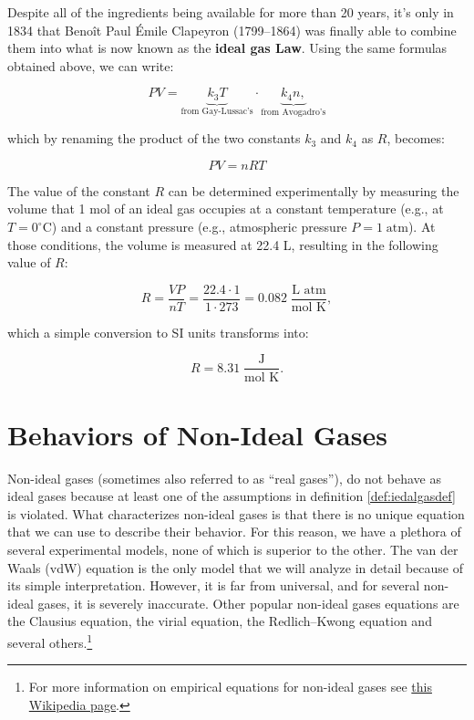 \documentclass[
  9pt,
]{extbook}
\theoremstyle{definition}
\theoremstyle{definition}
\theoremstyle{definition}
\theoremstyle{definition}
\theoremstyle{remark}
\begin{document}
Despite all of the ingredients being available for more than 20 years, it's only in 1834 that Benoît Paul Émile Clapeyron (1799--1864) was finally able to combine them into what is now known as the \textbf{ideal gas Law}. Using the same formulas obtained above, we can write:

\begin{equation}
PV=\underbrace{k_3 T}_{\text{from Gay-Lussac's}} \cdot \underbrace{k_4 n,}_{\text{from Avogadro's}}
\label{eq:ideallaw1}
\end{equation}

which by renaming the product of the two constants \(k_3\) and \(k_4\) as \(R\), becomes:

\begin{equation}
PV=nRT
\label{eq:ideallaw2}
\end{equation}

The value of the constant \(R\) can be determined experimentally by measuring the volume that 1 mol of an ideal gas occupies at a constant temperature (e.g., at \(T=0^\circ\mathrm{C}\)) and a constant pressure (e.g., atmospheric pressure \(P=1\;\mathrm{atm}\)). At those conditions, the volume is measured at 22.4 L, resulting in the following value of \(R\):

\begin{equation}
R=\frac{VP}{nT}=\frac{22.4 \cdot 1}{1 \cdot 273}=0.082 \;\frac{\text{L atm}}{\text{mol K}},
\label{eq:ideallaw3}
\end{equation}

which a simple conversion to SI units transforms into:

\begin{equation}
R=8.31\;\frac{\text{J}}{\text{mol K}}.
\label{eq:RvalueSI}
\end{equation}

\section{Behaviors of Non-Ideal Gases}\label{behaviors-of-non-ideal-gases}

Non-ideal gases (sometimes also referred to as ``real gases''), do not behave as ideal gases because at least one of the assumptions in definition \ref{def:iedalgasdef} is violated. What characterizes non-ideal gases is that there is no unique equation that we can use to describe their behavior. For this reason, we have a plethora of several experimental models, none of which is superior to the other. The van der Waals (vdW) equation is the only model that we will analyze in detail because of its simple interpretation. However, it is far from universal, and for several non-ideal gases, it is severely inaccurate. Other popular non-ideal gases equations are the Clausius equation, the virial equation, the Redlich--Kwong equation and several others.\footnote{For more information on empirical equations for non-ideal gases see \href{https://en.wikipedia.org/wiki/Real_gas}{this Wikipedia page}.}
\end{document}
